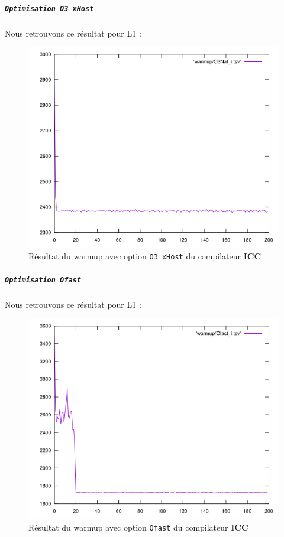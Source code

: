 \documentclass{report}
\begin{document}
\newpage
\subparagraph{ \texttt{Optimisation O3 xHost}}
Nous retrouvons ce résultat pour L1 :
  \begin{figure}[ht!]
    \centering
    \includegraphics[scale=0.45]{resources/warmup/L1/O3Nat_i.png}
    \caption{Résultat du warmup avec option \texttt{O3 xHost} du compilateur \textbf{ICC}}
  \end{figure}
  \newpage
\subparagraph{ \texttt{Optimisation Ofast}}
Nous retrouvons ce résultat pour L1 :
  \begin{figure}[ht!]
    \centering
    \includegraphics[scale=0.45]{resources/warmup/L1/Ofast_i.png}
    \caption{Résultat du warmup avec option \texttt{Ofast} du compilateur \textbf{ICC}}
  \end{figure}
\end{document}
